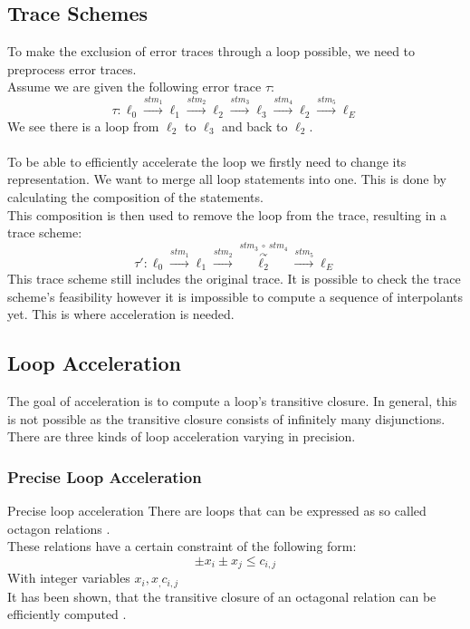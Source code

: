 \documentclass{article}
\newcommand\mycom[1]{}
\newcommand\mycom[1]{#1}
\newcommand{\jw}[1]{\mycom{\todo[color=blue!40,inline]{\small JW: #1}}}
\begin{document}
\subsection{Trace Schemes}
To make the exclusion of error traces through a loop possible, we need to preprocess error traces. \\
Assume we are given the following error trace $\tau$:
\begin{equation*}
\tau: \ell_0 \xrightarrow{\text{$stm_1$}} \ell_1 \xrightarrow{\text{$stm_2$}} \ell_2 \xrightarrow{\text{$stm_3$}} \ell_3 \xrightarrow{\text{$stm_4$}} \ell_2 \xrightarrow{\text{$stm_5$}} \ell_E
\end{equation*}
We see there is a loop from $\ell_2$ to $\ell_3$ and back to $\ell_2$.  \\ \\
To be able to efficiently accelerate the loop we firstly need to change its representation. We want to merge all loop statements into one. This is done by calculating the composition of the statements. \\
This composition is then used to remove the loop from the trace, resulting in a trace scheme:
\begin{equation*}
\tau':\ell_0 \xrightarrow{\text{$stm_1$}} \ell_1 \xrightarrow{\text{$stm_2$}} \overset{stm_3\ \circ \ stm_4}{\overset{\curvearrowright}{\ell_2}} \xrightarrow{\text{$stm_5$}} \ell_E
\end{equation*}
This trace scheme still includes the original trace. It is possible to check the trace scheme's feasibility however it is impossible to compute a sequence of interpolants yet. This is where acceleration is needed.

\subsection{Loop Acceleration}
\jw{Todo}
The goal of acceleration is to compute a loop's transitive closure. In general, this is not possible as the transitive closure consists of infinitely many disjunctions. There are three kinds of loop acceleration varying in precision.

\subsubsection{Precise Loop Acceleration}
Precise loop acceleration
 There are loops that can be expressed as so called octagon relations \cite{DBLP:journals/corr/abs-cs-0703084}. \\
These relations have a certain constraint of the following form: 
\begin{equation*}
	\pm x_i \pm x_j \leq c_{i,j}
\end{equation*}
With integer variables $x_i, x_, c_{i,j}$ \\
It has been shown, that the transitive closure of an octagonal relation can be efficiently computed \cite{10.1007/978-3-642-14295-6_23}.
\end{document}
